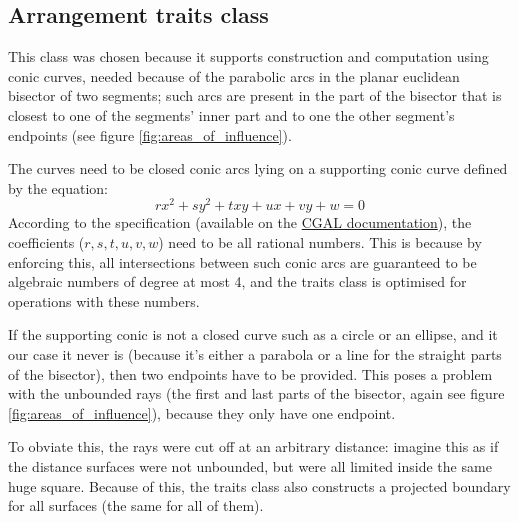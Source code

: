 \documentclass[11pt,a4paper,english]{article}
\begin{document}
	\subsection{Arrangement traits class }
	This class was chosen because it supports construction and computation using conic curves, needed because of the parabolic arcs in the planar euclidean bisector of two segments; such arcs are present in the part of the bisector that is closest to one of the segments' inner part and to one the other segment's endpoints (see figure \ref{fig:areas_of_influence}).\par
	The curves need to be closed conic arcs lying on a supporting conic curve defined by the equation:
	\[
		rx^{2} + sy^{2} + txy + ux + vy + w = 0 
	\]
	According to the specification (available on the \href{https://doc.cgal.org/latest/Arrangement_on_surface_2/classCGAL_1_1Arr__conic__traits__2.html}{CGAL documentation}), the coefficients (\(r, s, t, u ,v, w\)) need to be all rational numbers. This is because by enforcing this, all intersections between such conic arcs are guaranteed to be algebraic numbers of degree at most 4, and the traits class is optimised for operations with these numbers.\par
	If the supporting conic is not a closed curve such as a circle or an ellipse, and it our case it never is (because it's either a parabola or a line for the straight parts of the bisector), then two endpoints have to be provided. This poses a problem with the unbounded rays (the first and last parts of the bisector, again see figure \ref{fig:areas_of_influence}), because they only have one endpoint.\par
	To obviate this, the rays were cut off at an arbitrary distance: imagine this as if the distance surfaces were not unbounded, but were all limited inside the same huge square. Because of this, the traits class  also constructs a projected boundary for all surfaces (the same for all of them).
	
\end{document}
